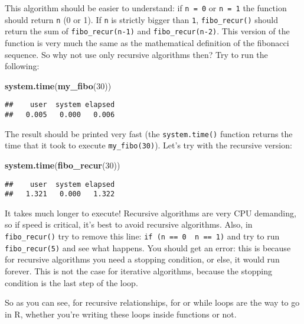\documentclass[
]{article}
\newenvironment{Shaded}{\begin{snugshade}}{\end{snugshade}}
\newcommand{\DecValTok}[1]{\textcolor[rgb]{0.00,0.00,0.81}{#1}}
\newcommand{\KeywordTok}[1]{\textcolor[rgb]{0.13,0.29,0.53}{\textbf{#1}}}
\newcommand{\NormalTok}[1]{#1}
\begin{document}
This algorithm should be easier to understand: if \texttt{n\ =\ 0} or \texttt{n\ =\ 1} the function should return \texttt{n}
(0 or 1). If \texttt{n} is strictly bigger than \texttt{1}, \texttt{fibo\_recur()} should return the sum of
\texttt{fibo\_recur(n-1)} and \texttt{fibo\_recur(n-2)}. This version of the function is very much the same as the
mathematical definition of the fibonacci sequence. So why not use only recursive algorithms
then? Try to run the following:

\begin{Shaded}
\begin{Highlighting}[]
\KeywordTok{system.time}\NormalTok{(}\KeywordTok{my\_fibo}\NormalTok{(}\DecValTok{30}\NormalTok{))}
\end{Highlighting}
\end{Shaded}

\begin{verbatim}
##    user  system elapsed 
##   0.005   0.000   0.006
\end{verbatim}

The result should be printed very fast (the \texttt{system.time()} function returns the time that it took
to execute \texttt{my\_fibo(30)}). Let's try with the recursive version:

\begin{Shaded}
\begin{Highlighting}[]
\KeywordTok{system.time}\NormalTok{(}\KeywordTok{fibo\_recur}\NormalTok{(}\DecValTok{30}\NormalTok{))}
\end{Highlighting}
\end{Shaded}

\begin{verbatim}
##    user  system elapsed 
##   1.321   0.000   1.322
\end{verbatim}

It takes much longer to execute! Recursive algorithms are very CPU demanding, so if speed is
critical, it's best to avoid recursive algorithms. Also, in \texttt{fibo\_recur()} try to remove this line:
\texttt{if\ (n\ ==\ 0\ \textbar{}\textbar{}\ n\ ==\ 1)} and try to run \texttt{fibo\_recur(5)} and see what happens. You should
get an error: this is because for recursive algorithms you need a stopping condition, or else,
it would run forever. This is not the case for iterative algorithms, because the stopping
condition is the last step of the loop.

So as you can see, for recursive relationships, for or while loops are the way to go in R, whether
you're writing these loops inside functions or not.
\end{document}

